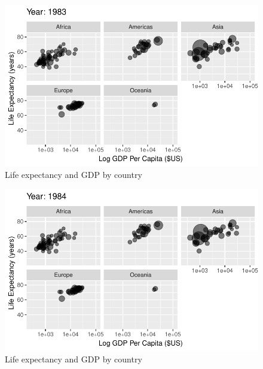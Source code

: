 \documentclass[
  letterpaper,
  DIV=11,
  numbers=noendperiod]{scrreport}
\theoremstyle{definition}
\theoremstyle{remark}
\begin{document}
\begin{figure}

{\centering \includegraphics{index_files/figure-pdf/fig-anim-lifegdp-57.pdf}

}

\caption{\label{fig-anim-lifegdp-57}Life expectancy and GDP by country}

\end{figure}

\begin{figure}

{\centering \includegraphics{index_files/figure-pdf/fig-anim-lifegdp-58.pdf}

}

\caption{\label{fig-anim-lifegdp-58}Life expectancy and GDP by country}

\end{figure}
\end{document}

